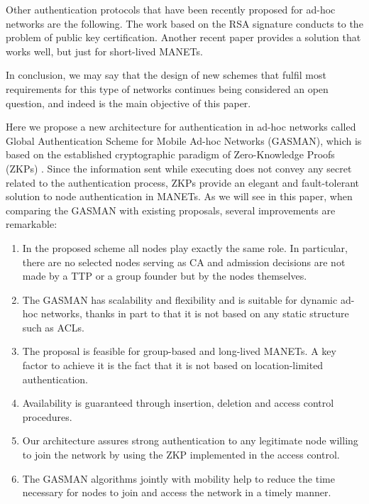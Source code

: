 \documentclass{article}
\begin{document}
Other authentication
protocols that have been recently proposed for ad-hoc networks are the following. The work \cite{HJYSCL05} based on the RSA signature conducts to the problem of
public key certification. Another recent paper
\cite{STY05} provides a solution that works well, but just for
short-lived MANETs. 

In conclusion, we may say that the design of new
schemes that fulfil most requirements for this type of networks
continues being considered an open question, and indeed  is the main objective of this paper.

Here we propose a new architecture for authentication in ad-hoc
networks called Global Authentication Scheme for Mobile Ad-hoc
Networks (GASMAN), which is based on the established cryptographic
paradigm of Zero-Knowledge Proofs (ZKPs) \cite{GMW86}. Since the information sent while executing does not convey any secret related to the
authentication process, ZKPs provide an elegant and fault-tolerant
solution to node authentication in MANETs. As we will see in this paper, when comparing the GASMAN with existing proposals, several improvements are remarkable:
 
\begin{enumerate}

\item In the proposed scheme all nodes play exactly the same role. In particular, there are no selected nodes serving as CA and admission decisions are not made by a TTP or a group founder but by the nodes themselves.

\item The GASMAN has scalability and flexibility and is suitable for dynamic ad-hoc networks, thanks in part to that  it is not based on any static structure such as  ACLs.

\item The proposal is feasible for group-based and long-lived MANETs. A key factor to achieve it is the fact that it is not based on location-limited authentication. 

\item Availability is guaranteed through 
insertion, deletion and access control procedures. 

\item Our
architecture assures strong authentication to any legitimate node
willing to join the network by using the ZKP
implemented in the access control. 

\item The GASMAN algorithms
jointly with mobility help to reduce the time necessary for nodes
to join and access the network in a timely manner. 
\end{enumerate}
\end{document}
